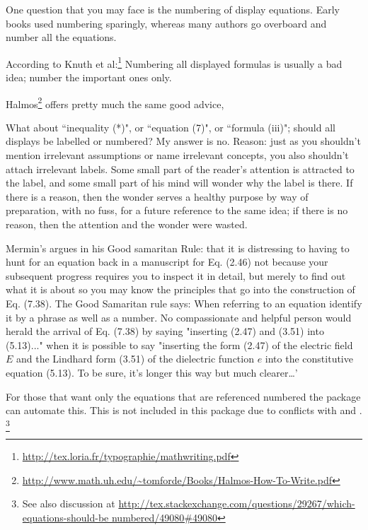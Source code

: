 {One question that you may face is the numbering of display equations. Early books used numbering sparingly, whereas many authors go overboard and number all the equations.

According to Knuth et al:\footnote{\url{http://tex.loria.fr/typographie/mathwriting.pdf}}
Numbering all displayed formulas is usually a bad idea; number the important ones only.

Halmos\footnote{\url{http://www.math.uh.edu/~tomforde/Books/Halmos-How-To-Write.pdf}} offers pretty much the same good advice,

\begin{latexquotation}
What about ``inequality (*)", or ``equation (7)", or ``formula (iii)"; should all displays be labelled or numbered? My answer is no. Reason: just as you shouldn't mention irrelevant assumptions or name irrelevant concepts, you also shouldn't attach irrelevant labels. Some small part of the reader's attention is attracted to the label, and some small part of his mind will wonder why the label is there. If there is a reason, then the wonder serves a healthy purpose by way of preparation, with no fuss, for a future reference to the same idea; if there is no reason, then the attention and the wonder were wasted.
\end{latexquotation}

Mermin's argues in his Good samaritan Rule: that it is distressing to having to hunt for an equation back in a manuscript for Eq. (2.46) not because your subsequent progress requires
you to inspect it in detail, but merely to find out what it is about so
you may know the principles that go into the construction of Eq. (7.38).
The Good Samaritan rule says: When referring to an equation identify it by
a phrase as well as a number. No compassionate and helpful person
would herald the arrival of Eq. (7.38) by saying "inserting (2.47) and (3.51)
into (5.13)..." when it is possible to say "inserting the form (2.47) of the
electric field $E$ and the Lindhard form (3.51) of the dielectric function $e$ into
the constitutive equation (5.13). To be sure, it's longer this way but much 
clearer\ldots'

For those that want only the equations that are referenced numbered the package  can automate this. This is not included in this package due to conflicts with  and .
\footnote{See also discussion at \protect\url{http://tex.stackexchange.com/questions/29267/which-equations-should-be numbered/49080\#49080}}

}

